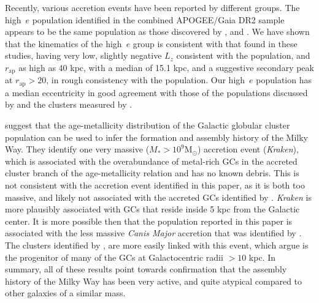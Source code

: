 Recently, various accretion events have been reported by different groups. The high~$e$ population identified in the combined APOGEE/Gaia
DR2 sample appears to be the same population as  those
discovered by \citet{2018MNRAS.478..611B}, \citet{2018arXiv180510288D} and
\citet{2018arXiv180606038H}.  We have shown that the kinematics of
the high~$e$ group is consistent with that found in these studies, having
very low, slightly negative $L_z$ consistent with the
\citet{2018arXiv180606038H} population, and $r_\mathrm{ap}$ as high
as 40 kpc, with a median of 15.1 kpc, and a suggestive secondary
peak at $r_\mathrm{ap} > 20$, in rough consistency with the
\citet{2018arXiv180510288D} population. Our high~$e$ population
has a median eccentricity in good agreement with those of
the populations discussed by \citet{2018MNRAS.478..611B} and the
clusters measured  by \citet{2018arXiv180500453M}.

\citet{2018MNRAS.tmp.1537K} suggest that the age-metallicity distribution of the Galactic globular cluster population can be used to infer the formation and assembly history of the Milky Way. They identify
one very massive ($M_* > 10^9\mathrm{M_\odot}$) accretion event
 (\emph{Kraken}), which is associated with the
overabundance of metal-rich GCs in the accreted cluster branch of
the age-metallicity relation and has no known debris. This is not
consistent with the accretion event identified in this paper, as it is both
too massive, and likely not associated with the accreted
GCs identified by \citet{2018arXiv180500453M}. \emph{Kraken} is more plausibly associated with GCs that reside inside 5 kpc from the Galactic center. It is more possible
then that the population reported in this paper \citep[and by
connection, likely also that of,
e.g.][]{2018MNRAS.478..611B,2018ApJ...852...49H,2018arXiv180606038H,2010A&A...511L..10N}
is associated with the less massive \emph{Canis Major} accretion
that was identified by \citet{2018MNRAS.tmp.1537K}. The clusters identified by
\citet{2018arXiv180500453M}, are
more easily linked with this event, which \citet{2018MNRAS.tmp.1537K}
argue is the progenitor of many of the GCs at Galactocentric radii $> 10$ kpc. In summary, all of these results point towards
confirmation that the assembly history of the Milky Way has been very active,
and quite atypical compared to other galaxies of a similar mass.

